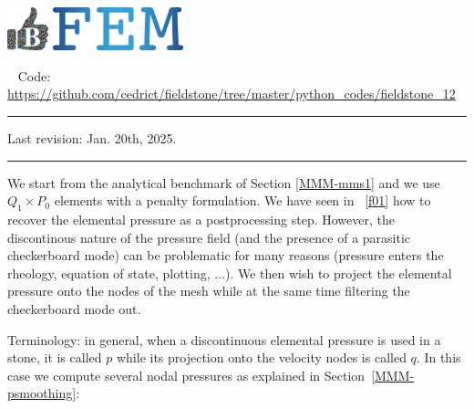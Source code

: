 \includegraphics[height=1.25cm]{images/pictograms/benchmark}
\includegraphics[height=1.25cm]{images/pictograms/FEM}


%

\begin{center}
\inpython ~
{\small Code: \url{https://github.com/cedrict/fieldstone/tree/master/python_codes/fieldstone_12}}
\end{center}

\par\noindent\rule{\textwidth}{0.4pt}

Last revision: Jan. 20th, 2025.

\par\noindent\rule{\textwidth}{0.4pt}


We start from the analytical benchmark of Section \ref{MMM-mms1} and we use $Q_1 \times P_0$
elements with a penalty formulation. 
We have seen in \stone~\ref{f01} how to recover the elemental pressure as a postprocessing step. 
However, the discontinous nature of the pressure field (and the presence of a
parasitic checkerboard mode) can be problematic for many reasons 
(pressure enters the rheology, equation of state, plotting, ...). 
We then wish to project the elemental pressure onto the nodes of the mesh while at the same 
time filtering the checkerboard mode out. 

Terminology: in general, when a discontinuous elemental pressure is used in a stone, 
it is called $p$ while its projection onto the velocity nodes is called $q$. 
In this case we compute several nodal pressures as explained in Section~\ref{MMM-psmoothing}:

